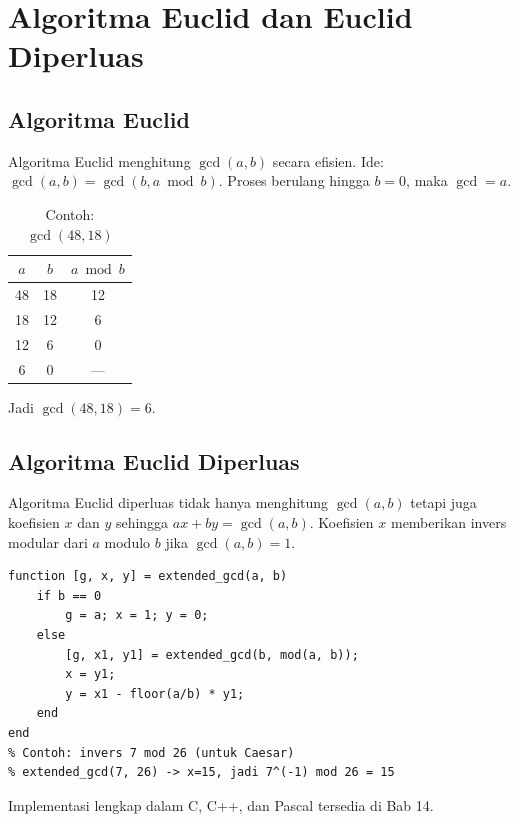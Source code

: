 \section{Algoritma Euclid dan Euclid Diperluas}

\subsection{Algoritma Euclid}
Algoritma Euclid menghitung $\gcd(a, b)$ secara efisien. Ide: $\gcd(a, b) = \gcd(b, a \bmod b)$. Proses berulang hingga $b = 0$, maka $\gcd = a$.

\begin{table}[!htbp]
\centering
\caption{Contoh: $\gcd(48, 18)$}
\label{tab:euclid}
\begin{tabular}{@{}ccc@{}}
\toprule
$a$ & $b$ & $a \bmod b$ \\
\midrule
48 & 18 & 12 \\
18 & 12 & 6 \\
12 & 6 & 0 \\
6 & 0 & --- \\
\bottomrule
\end{tabular}
\end{table}
Jadi $\gcd(48, 18) = 6$.

\subsection{Algoritma Euclid Diperluas}
Algoritma Euclid diperluas tidak hanya menghitung $\gcd(a, b)$ tetapi juga koefisien $x$ dan $y$ sehingga $ax + by = \gcd(a, b)$. Koefisien $x$ memberikan invers modular dari $a$ modulo $b$ jika $\gcd(a, b) = 1$.

\begin{lstlisting}[style=matlab,caption={Algoritma Euclid Diperluas dalam MATLAB}]
function [g, x, y] = extended_gcd(a, b)
    if b == 0
        g = a; x = 1; y = 0;
    else
        [g, x1, y1] = extended_gcd(b, mod(a, b));
        x = y1;
        y = x1 - floor(a/b) * y1;
    end
end
% Contoh: invers 7 mod 26 (untuk Caesar)
% extended_gcd(7, 26) -> x=15, jadi 7^(-1) mod 26 = 15
\end{lstlisting}

Implementasi lengkap dalam C, C++, dan Pascal tersedia di Bab 14.
